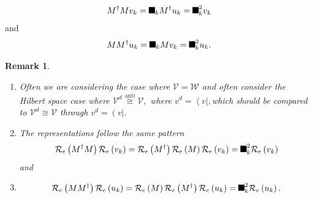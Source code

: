 \documentclass[aps,preprint]{revtex4}%
\providecommand{\U}[1]{\protect\rule{.1in}{.1in}}
\newtheorem{remark}[theorem]{Remark}
\begin{document}
%

\begin{equation}
M^{\dagger}Mv_{k}=\U{3c3} _{k}M^{\dagger}u_{k}=\U{3c3} _{k}^{2}v_{k}%
\end{equation}
and
\begin{equation}
MM^{\dagger}u_{k}=\U{3c3} _{k}Mv_{k}=\U{3c3} _{k}^{2}u_{k}.
\end{equation}


\begin{remark}
\begin{enumerate}
\item Often we are considering the case where $\mathcal{V=W}$ and often
consider the Hilbert space case where $\mathcal{V}^{d}\overset{\text{anti}%
}{\cong}\mathcal{V},$ where $v^{d}=\left\langle v\right\vert ,$which should be
compared to $\mathcal{V}^{d}\cong\mathcal{V}$ through $v^{d}=\left(
v\right\vert .$

\item The representations follow the same pattern%
\begin{equation}
\mathcal{R}_{e}\left(  M^{\dagger}M\right)  \mathcal{R}_{e}\left(
v_{k}\right)  =\mathcal{R}_{e}\left(  M^{\dagger}\right)  \mathcal{R}%
_{e}\left(  M\right)  \mathcal{R}_{e}\left(  v_{k}\right)  =\U{3c3} _{k}%
^{2}\mathcal{R}_{e}\left(  v_{k}\right)
\end{equation}
and

\item
\begin{equation}
\mathcal{R}_{e}\left(  MM^{\dagger}\right)  \mathcal{R}_{e}\left(
u_{k}\right)  =\mathcal{R}_{e}\left(  M\right)  \mathcal{R}_{e}\left(
M^{\dagger}\right)  \mathcal{R}_{e}\left(  u_{k}\right)  =\U{3c3} _{k}%
^{2}\mathcal{R}_{e}\left(  u_{k}\right)  .
\end{equation}

\end{enumerate}
\end{remark}
\end{document}
